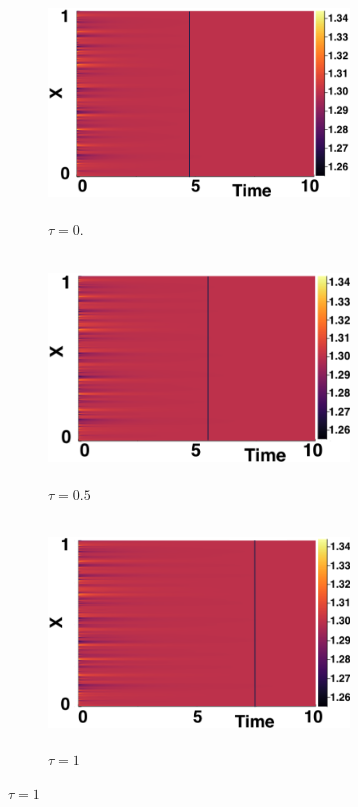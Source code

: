 \documentclass[12pt]{report}
\begin{document}
\begin{figure}[H]
    \centering
    \begin{subfigure}[b]{0.45\textwidth}
        \centering
        \includegraphics[width=8cm,height=6cm]{decay1.png}
        \caption{$\tau=0$.}
        \label{}
    \end{subfigure}
    \hfill
    \begin{subfigure}[b]{0.45\textwidth}
        \centering
        \includegraphics[width=8cm,height=6cm]{decay2.png}
        \caption{$\tau=0.5$}
        \label{}
    \end{subfigure}
    \hfill
    \begin{subfigure}[b]{0.45\textwidth}
        \centering
        \includegraphics[width=8cm,height=6cm]{decay3.png}
        \caption{$\tau=1$}
        \label{}
    \end{subfigure}

\end{figure}
\end{document}
